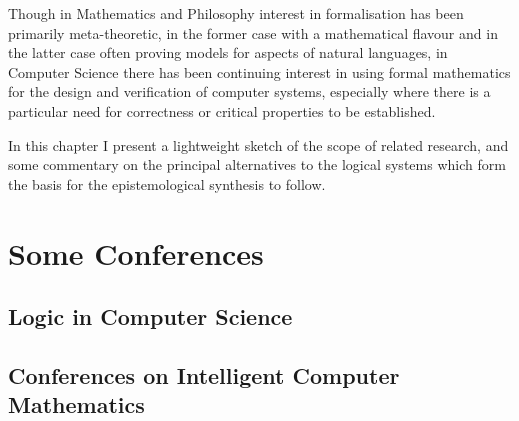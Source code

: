 \documentclass[10pt,titlepage]{book}
\begin{document}
Though in Mathematics and Philosophy interest in formalisation has been primarily meta-theoretic, in the former case with a mathematical flavour and in the latter case often proving models for aspects of natural languages, in Computer Science there has been continuing interest in using formal mathematics for the design and verification of computer systems, especially where there is a particular need for correctness or critical properties to be established.

In this chapter I present a lightweight sketch of the scope of related research, and some commentary on the principal alternatives to the logical systems which form the basis for the epistemological synthesis to follow.

\section{Some Conferences}

\subsection{Logic in Computer Science}

\subsection{Conferences on Intelligent Computer Mathematics}





\label{index}
{\twocolumn[]
{\small\printindex}}





\end{document}
